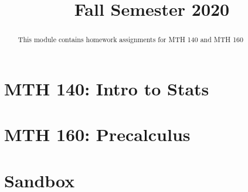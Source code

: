 \documentclass{xourse}
\title{Fall Semester 2020}
\begin{document}
  
\begin{abstract} %
This module contains homework assignments for MTH 140 and MTH 160
\end{abstract}  
\maketitle  
\part{MTH 140: Intro to Stats} 


\part{MTH 160: Precalculus}

\part{Sandbox}



 
\end{document}
